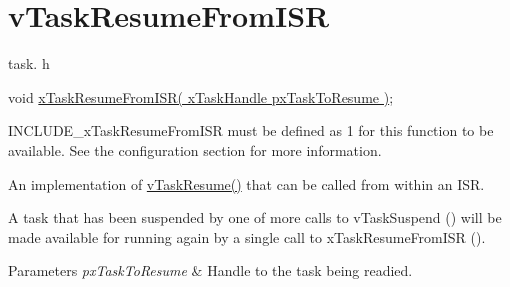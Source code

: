 \hypertarget{group__v_task_resume_from_i_s_r}{\section{v\-Task\-Resume\-From\-I\-S\-R}
\label{group__v_task_resume_from_i_s_r}
}
task. h 
\begin{DoxyPre}void \hyperlink{tasks_8c_a34169c2f610f3dc919b58434de245ba1}{xTaskResumeFromISR( xTaskHandle pxTaskToResume )};\end{DoxyPre}


I\-N\-C\-L\-U\-D\-E\-\_\-x\-Task\-Resume\-From\-I\-S\-R must be defined as 1 for this function to be available. See the configuration section for more information.

An implementation of \hyperlink{task_8h_a7fa2251fa4af33a27b23b9c481023735}{v\-Task\-Resume()} that can be called from within an I\-S\-R.

A task that has been suspended by one of more calls to v\-Task\-Suspend () will be made available for running again by a single call to x\-Task\-Resume\-From\-I\-S\-R ().


\begin{DoxyParams}{Parameters}
{\em px\-Task\-To\-Resume} & Handle to the task being readied. \\
\hline
\end{DoxyParams}
